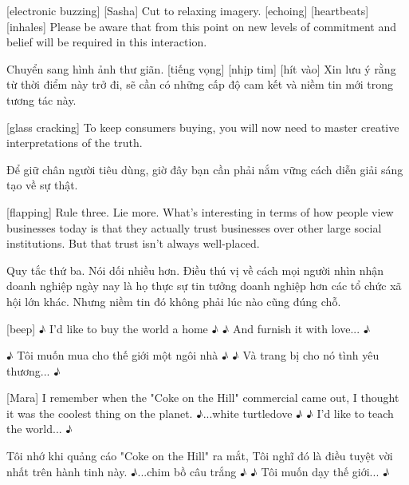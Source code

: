 \documentclass[a4paper]{article}
\begin{document}
	[electronic buzzing]
	[Sasha] Cut to relaxing imagery. [echoing]
	[heartbeats]
	[inhales]
	Please be aware that from this point on new levels of commitment and belief will be required in this interaction.
	
	\begin{vietnamese-v2}
		 Chuyển sang hình ảnh thư giãn. [tiếng vọng]
		[nhịp tim]
		[hít vào]
		Xin lưu ý rằng từ thời điểm này trở đi, sẽ cần có những cấp độ cam kết và niềm tin mới trong tương tác này.
	\end{vietnamese-v2}
	
	[glass cracking]
	To keep consumers buying, you will now need to master creative interpretations of the truth.
	
	\begin{vietnamese-v2}
		Để giữ chân người tiêu dùng, giờ đây bạn cần phải nắm vững cách diễn giải sáng tạo về sự thật.
	\end{vietnamese-v2}
	
	[flapping]
	Rule three. Lie more.
	What's interesting in terms of how people view businesses today is that they actually trust businesses over other large social institutions.
	But that trust isn't always well-placed.
	
	\begin{vietnamese-v2}
		[vỗ tay]
		Quy tắc thứ ba. Nói dối nhiều hơn.
		Điều thú vị về cách mọi người nhìn nhận doanh nghiệp ngày nay là họ thực sự tin tưởng doanh nghiệp hơn các tổ chức xã hội lớn khác.
		Nhưng niềm tin đó không phải lúc nào cũng đúng chỗ.
	\end{vietnamese-v2}
	
	[beep]
	♪ I'd like to buy the world a home ♪
	♪ And furnish it with love... ♪
	
	\begin{vietnamese-v2}
		[bíp]
		♪ Tôi muốn mua cho thế giới một ngôi nhà ♪
		♪ Và trang bị cho nó tình yêu thương... ♪
	\end{vietnamese-v2}
	
	[Mara] I remember when the "Coke on the Hill" commercial came out,
	I thought it was the coolest thing on the planet.
	♪...white turtledove ♪
	♪ I'd like to teach the world... ♪
	
	\begin{vietnamese-v2}
		[Mara] Tôi nhớ khi quảng cáo "Coke on the Hill" ra mắt,
		Tôi nghĩ đó là điều tuyệt vời nhất trên hành tinh này.
		♪...chim bồ câu trắng ♪
		♪ Tôi muốn dạy thế giới... ♪
	\end{vietnamese-v2}
	
\end{document}

